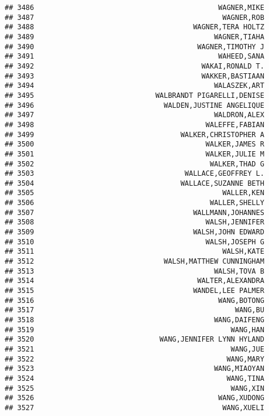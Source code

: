 \documentclass[
]{article}
\begin{document}
\begin{verbatim}
## 3486                                            WAGNER,MIKE
## 3487                                             WAGNER,ROB
## 3488                                      WAGNER,TERA HOLTZ
## 3489                                           WAGNER,TIAHA
## 3490                                       WAGNER,TIMOTHY J
## 3491                                            WAHEED,SANA
## 3492                                        WAKAI,RONALD T.
## 3493                                        WAKKER,BASTIAAN
## 3494                                           WALASZEK,ART
## 3495                             WALBRANDT PIGARELLI,DENISE
## 3496                               WALDEN,JUSTINE ANGELIQUE
## 3497                                           WALDRON,ALEX
## 3498                                         WALEFFE,FABIAN
## 3499                                   WALKER,CHRISTOPHER A
## 3500                                         WALKER,JAMES R
## 3501                                         WALKER,JULIE M
## 3502                                          WALKER,THAD G
## 3503                                    WALLACE,GEOFFREY L.
## 3504                                   WALLACE,SUZANNE BETH
## 3505                                             WALLER,KEN
## 3506                                          WALLER,SHELLY
## 3507                                      WALLMANN,JOHANNES
## 3508                                         WALSH,JENNIFER
## 3509                                      WALSH,JOHN EDWARD
## 3510                                         WALSH,JOSEPH G
## 3511                                             WALSH,KATE
## 3512                               WALSH,MATTHEW CUNNINGHAM
## 3513                                           WALSH,TOVA B
## 3514                                       WALTER,ALEXANDRA
## 3515                                      WANDEL,LEE PALMER
## 3516                                            WANG,BOTONG
## 3517                                                WANG,BU
## 3518                                           WANG,DAIFENG
## 3519                                               WANG,HAN
## 3520                              WANG,JENNIFER LYNN HYLAND
## 3521                                               WANG,JUE
## 3522                                              WANG,MARY
## 3523                                           WANG,MIAOYAN
## 3524                                              WANG,TINA
## 3525                                               WANG,XIN
## 3526                                            WANG,XUDONG
## 3527                                             WANG,XUELI

\end{verbatim}
\end{document}
